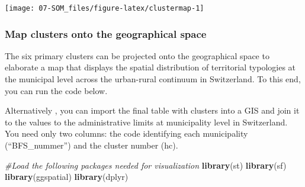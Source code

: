 \documentclass[
]{article}
\newenvironment{Shaded}{\begin{snugshade}}{\end{snugshade}}
\newcommand{\AttributeTok}[1]{\textcolor[rgb]{0.13,0.29,0.53}{#1}}
\newcommand{\CommentTok}[1]{\textcolor[rgb]{0.56,0.35,0.01}{\textit{#1}}}
\newcommand{\FunctionTok}[1]{\textcolor[rgb]{0.13,0.29,0.53}{\textbf{#1}}}
\newcommand{\NormalTok}[1]{#1}
\newcommand{\OtherTok}[1]{\textcolor[rgb]{0.56,0.35,0.01}{#1}}
\newcommand{\SpecialCharTok}[1]{\textcolor[rgb]{0.81,0.36,0.00}{\textbf{#1}}}
\newcommand{\StringTok}[1]{\textcolor[rgb]{0.31,0.60,0.02}{#1}}
\begin{document}
\begin{center}\texttt{[image: 07-SOM\_files/figure-latex/clustermap-1]} \end{center}

\begin{Shaded}
\end{Shaded}

\subsubsection{\texorpdfstring{\textbf{Map clusters onto the geographical space}}{Map clusters onto the geographical space}}\label{map-clusters-onto-the-geographical-space}

The six primary clusters can be projected onto the geographical space to elaborate a map that displays the spatial distribution of territorial typologies at the municipal level across the urban-rural continuum in Switzerland.
To this end, you can run the code below.

Alternatively , you can import the final table with clusters into a GIS and join it to the values to the administrative limits at municipality level in Switzerland.
You need only two columns: the code identifying each municipality (``BFS\_nummer'') and the cluster number (hc).

\begin{Shaded}
\begin{Highlighting}[]
\CommentTok{\#Load the following packages needed for visualization}
\FunctionTok{library}\NormalTok{(st)}
\FunctionTok{library}\NormalTok{(sf)}
\FunctionTok{library}\NormalTok{(ggspatial)}
\FunctionTok{library}\NormalTok{(dplyr)}
\end{Highlighting}
\end{Shaded}
\end{document}
